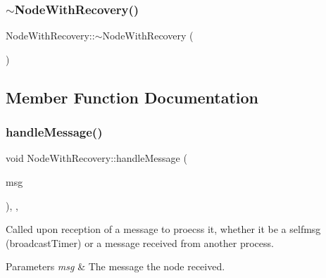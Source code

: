 \mbox{\label{class_node_with_recovery_a5cb1367a800cf960b96c9011ab94a616}} 
\subsubsection{\texorpdfstring{$\sim$\+Node\+With\+Recovery()}{~NodeWithRecovery()}}
{\footnotesize\ttfamily Node\+With\+Recovery\+::$\sim$\+Node\+With\+Recovery (\begin{DoxyParamCaption}{ }\end{DoxyParamCaption})\hspace{0.3cm}{\ttfamily [virtual]}}



\subsection{Member Function Documentation}
\mbox{\label{class_node_with_recovery_a901c89606b84898e13fe8a66228acd9f}} 
\subsubsection{\texorpdfstring{handle\+Message()}{handleMessage()}}
{\footnotesize\ttfamily void Node\+With\+Recovery\+::handle\+Message (\begin{DoxyParamCaption}\item[{c\+Message $\ast$}]{msg }\end{DoxyParamCaption})\hspace{0.3cm}{\ttfamily [override]}, {\ttfamily [protected]}, {\ttfamily [virtual]}}



Called upon reception of a message to proecss it, whether it be a selfmsg (broadcast\+Timer) or a message received from another process. 


\begin{DoxyParams}{Parameters}
{\em msg} & The message the node received. \\
\hline
\end{DoxyParams}


